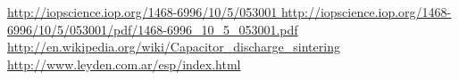 \documentclass[12pt]{article}
\begin{document}
% 


  \newpage

  \begin{thebibliography}{1}
     \url{ http://iopscience.iop.org/1468-6996/10/5/053001 }
     \url{ http://iopscience.iop.org/1468-6996/10/5/053001/pdf/1468-6996_10_5_053001.pdf }
     \url{ http://en.wikipedia.org/wiki/Capacitor_discharge_sintering }    
     \url{ http://www.leyden.com.ar/esp/index.html }

  \end{thebibliography}
    
\end{document}
